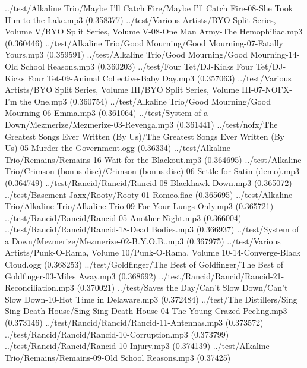 \begin{listing}{1}
../test/Alkaline Trio/Maybe I'll Catch Fire/Maybe I'll Catch Fire-08-She Took Him to the Lake.mp3 (0.358377)
../test/Various Artists/BYO Split Series, Volume V/BYO Split Series, Volume V-08-One Man Army-The Hemophiliac.mp3 (0.360446)
../test/Alkaline Trio/Good Mourning/Good Mourning-07-Fatally Yours.mp3 (0.359591)
../test/Alkaline Trio/Good Mourning/Good Mourning-14-Old School Reasons.mp3 (0.360203)
../test/Four Tet/DJ-Kicks Four Tet/DJ-Kicks Four Tet-09-Animal Collective-Baby Day.mp3 (0.357063)
../test/Various Artists/BYO Split Series, Volume III/BYO Split Series, Volume III-07-NOFX-I'm the One.mp3 (0.360754)
../test/Alkaline Trio/Good Mourning/Good Mourning-06-Emma.mp3 (0.361064)
../test/System of a Down/Mezmerize/Mezmerize-03-Revenga.mp3 (0.361441)
../test/nofx/The Greatest Songs Ever Written (By Us)/The Greatest Songs Ever Written (By Us)-05-Murder the Government.ogg (0.36334)
../test/Alkaline Trio/Remains/Remains-16-Wait for the Blackout.mp3 (0.364695)
../test/Alkaline Trio/Crimson (bonus disc)/Crimson (bonus disc)-06-Settle for Satin (demo).mp3 (0.364749)
../test/Rancid/Rancid/Rancid-08-Blackhawk Down.mp3 (0.365072)
../test/Basement Jaxx/Rooty/Rooty-01-Romeo.flac (0.365695)
../test/Alkaline Trio/Alkaline Trio/Alkaline Trio-09-For Your Lungs Only.mp3 (0.365721)
../test/Rancid/Rancid/Rancid-05-Another Night.mp3 (0.366004)
../test/Rancid/Rancid/Rancid-18-Dead Bodies.mp3 (0.366937)
../test/System of a Down/Mezmerize/Mezmerize-02-B.Y.O.B..mp3 (0.367975)
../test/Various Artists/Punk-O-Rama, Volume 10/Punk-O-Rama, Volume 10-14-Converge-Black Cloud.ogg (0.368253)
../test/Goldfinger/The Best of Goldfinger/The Best of Goldfinger-03-Miles Away.mp3 (0.368692)
../test/Rancid/Rancid/Rancid-21-Reconciliation.mp3 (0.370021)
../test/Saves the Day/Can't Slow Down/Can't Slow Down-10-Hot Time in Delaware.mp3 (0.372484)
../test/The Distillers/Sing Sing Death House/Sing Sing Death House-04-The Young Crazed Peeling.mp3 (0.373146)
../test/Rancid/Rancid/Rancid-11-Antennas.mp3 (0.373572)
../test/Rancid/Rancid/Rancid-10-Corruption.mp3 (0.373799)
../test/Rancid/Rancid/Rancid-10-Injury.mp3 (0.374139)
../test/Alkaline Trio/Remains/Remains-09-Old School Reasons.mp3 (0.37425)
\end{listing}

